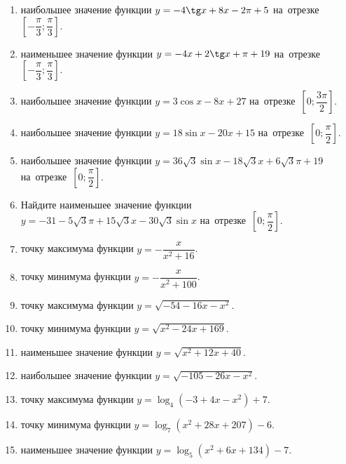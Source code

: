 \documentclass[a4paper,10pt]{article}
\begin{document}
\begin{enumerate}
\item {} наибольшее значение функции $y=-4\tg x +8x-2\pi +5$ на~отрезке~$\left[-\dfrac{\pi}{3};\dfrac{\pi}{3}\right]$.

\item {} наименьшее значение функции $y=-4x +2\tg x+\pi+19$ на~отрезке~$\left[-\dfrac{\pi}{3};\dfrac{\pi}{3}\right]$.

\item {} наибольшее значение функции $y=3\cos x-8x+27$ на~отрезке~$\left[0;\dfrac{3\pi}{2}\right]$.

\item {} наибольшее значение функции $y=18\sin x-20x+15$ на~отрезке~$\left[0;\dfrac{\pi}{2}\right]$.

\item {} наибольшее значение функции $y=36\sqrt{3}\sin x-18\sqrt{3}x+6\sqrt{3}\pi +19$ на~отрезке~$\left[0;\dfrac{\pi}{2}\right]$.

\item Найдите наименьшее значение функции $y=-31-5\sqrt{3}\pi+15\sqrt{3}x-30\sqrt{3}\sin x$ на~отрезке~$\left[0;\dfrac{\pi}{2}\right]$.

\item {} точку максимума функции $y=-\dfrac{x}{ x^2 +16}$.

\item {} точку минимума функции $y=-\dfrac{x}{ x^2 +100}$.

\item {} точку максимума функции $y=\sqrt{-54-16x-x^2}$.

\item {} точку минимума функции $y=\sqrt{x^2-24x+169}$.

\item {} наименьшее значение функции $y=\sqrt{x^2+12x+40}$.

\item {} наибольшее значение функции $y=\sqrt{-105-26x-x^2}$.

\item {} точку максимума функции $y=\log_4\left(-3+4x-x^2\right)+7$.

\item {} точку минимума функции $y=\log_7\left(x^2+28x+207\right)-6$.

\item {} наименьшее значение функции $y=\log_5\left(x^2+6x+134\right)-7$.


\end{enumerate}
\end{document}
